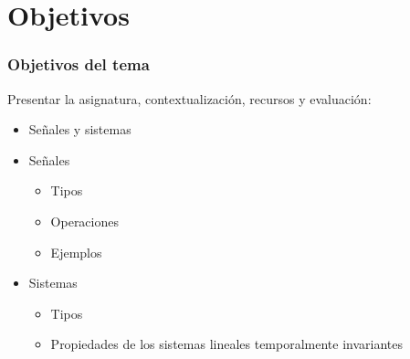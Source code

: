 \section{Objetivos}

\begin{frame}
  \frametitle{Objetivos del tema}
  Presentar la asignatura, contextualización, recursos y evaluación:
  \vspace{0.1cm}
  \begin{itemize}
    \item{Señales y sistemas}
    \item {Señales}
    \begin{itemize}
      \item Tipos
      \item Operaciones
      \item Ejemplos
    \end{itemize}
    \item{Sistemas}
    \begin{itemize}
      \item Tipos
      \item Propiedades de los sistemas lineales temporalmente invariantes
    \end{itemize}
  \end{itemize}
\end{frame}
